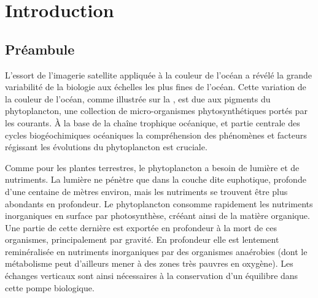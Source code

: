 
\chapter{Introduction}
\addChpLof
\label{chp:introduction}
\graphicspath{{resources/introduction}}

{
  \hypersetup{hidelinks}
  \minitoc%
  \clearpage
}

\begin{figure}[!h]
  \centering
  {%
    \setlength{\fboxsep}{0pt}%
  }%
  \label{fig:oc-illustration}
\end{figure}

\vspace{1\baselineskip}

\section{Préambule}

L'essort de l'imagerie satellite appliquée à la couleur de l'océan  a révélé la grande variabilité de la biologie aux échelles les plus fines de l'océan.
Cette variation de la couleur de l'océan, comme illustrée sur la , est due aux pigments du phytoplancton, une collection de micro-organismes phytosynthétiques portés par les courants.
À la base de la chaîne trophique océanique, et partie centrale des cycles biogéochimiques océaniques  la compréhension des phénomènes et facteurs régissant les évolutions du phytoplancton est cruciale.

Comme pour les plantes terrestres, le phytoplancton a besoin de lumière et de nutriments.
La lumière ne pénètre que dans la couche dite euphotique, profonde d'une centaine de mètres environ, mais les nutriments se trouvent être plus abondants en profondeur.
Le phytoplancton consomme rapidement les nutriments inorganiques en surface par photosynthèse, crééant ainsi de la matière organique.
Une partie de cette dernière est exportée en profondeur à la mort de ces organismes, principalement par gravité.
En profondeur elle est lentement reminéralisée en nutriments inorganiques par des organismes anaérobies (dont le métabolisme peut d'ailleurs mener à des zones très pauvres en oxygène).
Les échanges verticaux  sont ainsi nécessaires à la conservation d'un équilibre dans cette pompe biologique.

